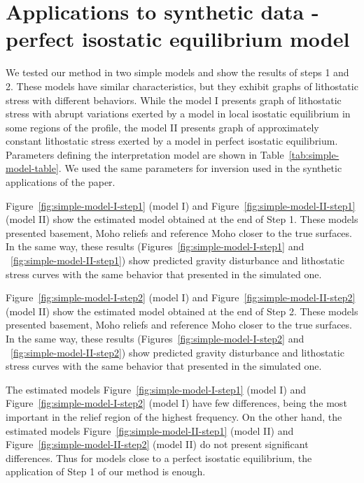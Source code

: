 \documentclass[manuscript]{geophysics}
\begin{document}
\section{Applications to synthetic data - perfect isostatic equilibrium model}

We tested our method in two simple models and show the results of steps 1 and 2. These models have similar characteristics, but they exhibit graphs of lithostatic stress with different behaviors. While the model I presents graph of lithostatic stress with abrupt variations exerted by a model in local isostatic equilibrium in some regions of the profile, the model II presents graph of approximately constant lithostatic stress exerted by a model in perfect isostatic equilibrium. Parameters defining the interpretation model are shown in Table~\ref{tab:simple-model-table}. We used the same parameters for inversion used in the synthetic applications of the paper.

Figure~\ref{fig:simple-model-I-step1} (model I) and Figure~\ref{fig:simple-model-II-step1} (model II) show the estimated model obtained at the end of Step 1. These models presented basement, Moho reliefs and reference Moho closer to the true surfaces. In the same way, these results (Figures~\ref{fig:simple-model-I-step1} and ~\ref{fig:simple-model-II-step1}) show predicted gravity disturbance and lithostatic stress curves with the same behavior that presented in the simulated one. 

Figure~\ref{fig:simple-model-I-step2} (model I) and Figure~\ref{fig:simple-model-II-step2} (model II) show the estimated model obtained at the end of Step 2. These models presented basement, Moho reliefs and reference Moho closer to the true surfaces. In the same way, these results (Figures~\ref{fig:simple-model-I-step2} and ~\ref{fig:simple-model-II-step2}) show predicted gravity disturbance and lithostatic stress curves with the same behavior that presented in the simulated one. 

The estimated models Figure~\ref{fig:simple-model-I-step1} (model I) and Figure~\ref{fig:simple-model-I-step2} (model I) have few differences, being the most important in the relief region of the highest frequency. On the other hand, the estimated models Figure~\ref{fig:simple-model-II-step1} (model II) and Figure~\ref{fig:simple-model-II-step2} (model II) do not present significant differences. Thus for models close to a perfect isostatic equilibrium, the application of Step 1 of our method is enough. 


\end{document}
